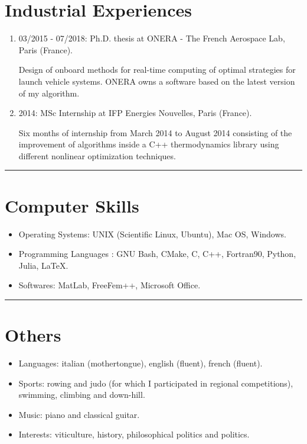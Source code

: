 \documentclass[a4paper,12pt]{article}
\begin{document}
\section{Industrial Experiences}

\begin{enumerate}
\item 03/2015 - 07/2018: Ph.D. thesis at ONERA - The French Aerospace Lab, Paris (France).

Design of onboard methods for real-time computing of optimal strategies for launch vehicle systems. ONERA owns a software based on the latest version of my algorithm.
\item 2014: MSc Internship at IFP Energies Nouvelles, Paris (France).

Six months of internship from March 2014 to August 2014 consisting of the improvement of algorithms inside a C++ thermodynamics library using
different nonlinear optimization techniques.
\end{enumerate}

\begingroup
\begin{center}
\noindent\rule{7cm}{0.4pt}
\end{center}
\endgroup

\section{Computer Skills}

\begin{itemize}
\item Operating Systems: UNIX (Scientific Linux, Ubuntu), Mac OS, Windows.
\item Programming Languages : GNU Bash, CMake, C, C++, Fortran90, Python, Julia, \LaTeX.
\item Softwares: MatLab, FreeFem++, Microsoft Office.
\end{itemize}

\begingroup
\begin{center}
\noindent\rule{7cm}{0.4pt}
\end{center}
\endgroup

\section{Others}

\begin{itemize}
\item Languages: italian (mothertongue), english (fluent), french (fluent).
\item Sports: rowing and judo (for which I participated in regional competitions), swimming, climbing and down-hill.
\item Music: piano and classical guitar.
\item Interests: viticulture, history, philosophical politics and politics.
\end{itemize}
\end{document}
